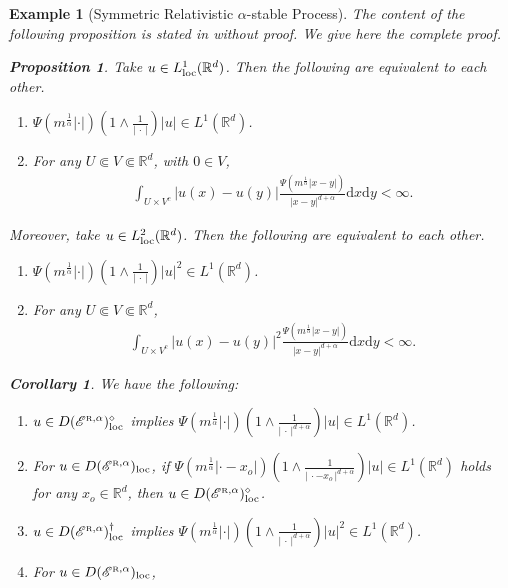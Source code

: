 \documentclass[12pt,a4paper]{article}
\newtheorem{prop}[thm]{Proposition}
\newtheorem{cor}[thm]{Corollary}
\newtheorem{example}[thm]{Example}
\newcommand{\R}{\mathbb{R}}
\renewcommand{\d}{\mathrm{d}}
\newcommand{\loc}{{\rm loc}}
\newcommand{\1}{{\bf 1}}
\begin{document}
\begin{example}[Symmetric Relativistic $\alpha$-stable Process]
The content of the following proposition is stated in 
\cite[Example~4.2]{CK} 
without proof. We give here the complete proof. 
\begin{prop}\label{prop:CharacRelativiStabel}
Take $u\in L^1_{\loc}(\R^d)$. Then 
the following are equivalent to each other. 
\begin{enumerate}
\item[\rm(1)] $\Psi(m^{\frac{1}{\alpha}}|\cdot|)\left(1\land\frac{1}{|\,\cdot\,|} \right)|u|\in L^1(\R^d)$. 
\item[\rm(2)] For any $U\Subset V\Subset \R^d$, 
with $0\in V$, 
\begin{align*}
\int_{U\times V^c}|u(x)-u(y)|\frac{\Psi(m^{\frac{1}{\alpha}}|x-y|)}{|x-y|^{d+\alpha}}{\d} x{\d} y<\infty.
\end{align*}
\end{enumerate}
Moreover, take $u\in L^2_{\loc}(\R^d)$. Then the following are equivalent to each other.
\begin{enumerate}
\item[\rm(3)] $\Psi(m^{\frac{1}{\alpha}}|\cdot|)\left(1\land\frac{1}{|\,\cdot\,|} \right)|u|^2\in L^1(\R^d)$. 
\item[\rm(4)] For any $U\Subset V\Subset \R^d$, 
\begin{align*}
\int_{U\times V^c}|u(x)-u(y)|^2\frac{\Psi(m^{\frac{1}{\alpha}}|x-y|)}{|x-y|^{d+\alpha}}{\d} x{\d} y<\infty.
\end{align*}
\end{enumerate}
\end{prop}
\begin{cor}\label{cor::CharacRelativiStabel}
We have the following: 
\begin{enumerate}
\item[\rm(1)] $u\in D(\mathscr{E}^{\text{\tiny\rm R},\alpha}
)^{\diamond}_{\loc}$ implies  
$\Psi(m^{\frac{1}{\alpha}}|\cdot|)\left(1\land\frac{1}{
|\,\cdot\,|^{d+\alpha}} \right)|u|\in L^1(\R^d)$. 
\item[\rm(2)] For $u\in D(\mathscr{E}^{\text{\tiny\rm R},\alpha})_{\loc}$, 
 if  $\Psi(m^{\frac{1}{\alpha}}|\cdot-x_o|)
\left(1\land\frac{1}{|\,\cdot-x_o\,|^{d+\alpha}} \right)|u|\in L^1(\R^d)$ holds for any $x_o\in\R^d$, then $u\in D(\mathscr{E}^{\text{\tiny\rm R},\alpha})^{\diamond}_{\loc}$. 
\item[\rm(3)] $u\in D(\mathscr{E}^{\text{\tiny\rm R},\alpha})^{\dag}_{\loc}$ implies   
$\Psi(m^{\frac{1}{\alpha}}|\cdot|)\left(1\land\frac{1}{
|\,\cdot\,|^{d+\alpha}} \right)|u|^2\in L^1(\R^d)$.
\item[\rm(4)] For $u\in D(\mathscr{E}^{\text{\tiny\rm R},\alpha})_{\loc}$, 

\end{enumerate}
\end{cor}
\end{example}
\end{document}

